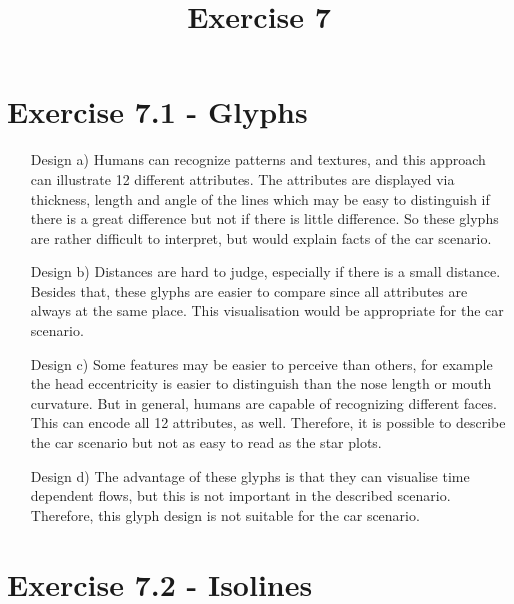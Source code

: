 \documentclass[a4paper]{article}
\date{}
\author{}
\title{Exercise 7}
\begin{document}
\maketitle 
\thispagestyle{fancy}


\section*{Exercise 7.1 - Glyphs}
\begin{enumerate}
	\item[Design a)]
		Humans can recognize patterns and textures, and this approach can illustrate 12 different attributes. 
		The attributes are displayed via thickness, length and angle of the lines which may be easy to distinguish if there is a great difference but not if there is little difference. 
		So these glyphs are rather difficult to interpret, but would explain facts of the car scenario. 
	\item [Design b)]
		Distances are hard to judge, especially if there is a small distance. 
		Besides that, these glyphs are easier to compare since all attributes are always at the same place.
		This visualisation would be appropriate for the car scenario. 	
	\item[Design c)]
		Some features may be easier to perceive than others, for example the head eccentricity is easier to distinguish than the nose length or mouth curvature. 
		But in general, humans are capable of recognizing different faces. 
		This can encode all 12 attributes, as well. 
		Therefore, it is possible to describe the car scenario but not as easy to read as the star plots. 
	\item[Design d)]
		The advantage of these glyphs is that they can visualise time dependent flows, but this is not important in the described scenario. 
		Therefore, this glyph design is not suitable for the car scenario. 
\end{enumerate}

\newpage
\section*{Exercise 7.2 - Isolines}
\end{document}
